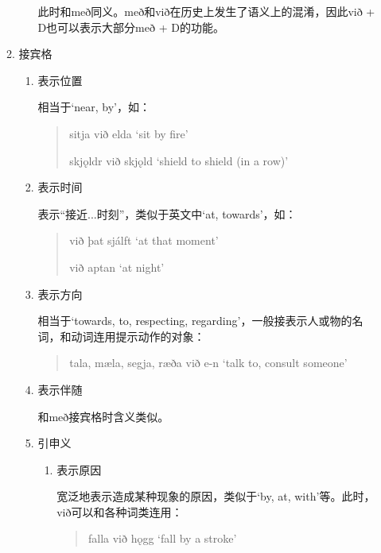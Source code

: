 \begin{enumerate}[itemindent=1em, label=\textbf{\arabic*}.]
\begin{enumerate}
\begin{enumerate}
                              此时和með同义。með和við在历史上发生了语义上的混淆，因此við + D也可以表示大部分með + D的功能。
                    \end{enumerate}

              \item 接宾格
                    \begin{enumerate}
                        \item 表示位置

                              相当于`near, by'，如：
                              \begin{quote}
                                  sitja við elda `sit by fire'

                                  skj\k{o}ldr við skj\k{o}ld `shield to shield (in a row)'
                              \end{quote}

                        \item 表示时间

                              表示“接近...时刻”，类似于英文中`at, towards'，如：
                              \begin{quote}
                                  við þat sjálft `at that moment'

                                  við aptan `at night'
                              \end{quote}

                        \item 表示方向

                              相当于`towards, to, respecting, regarding'，一般接表示人或物的名词，和动词连用提示动作的对象：
                              \begin{quote}
                                  tala, mæla, segja, ræða við e-n `talk to, consult someone'
                              \end{quote}

                        \item 表示伴随

                              和með接宾格时含义类似。

                        \item 引申义
                              \begin{enumerate}
                                  \item 表示原因

                                        宽泛地表示造成某种现象的原因，类似于`by, at, with'等。此时，við可以和各种词类连用：
                                        \begin{quote}
                                            falla við h\k{o}gg `fall by a stroke'


\end{quote}
\end{enumerate}
\end{enumerate}
\end{enumerate}
\end{enumerate}
